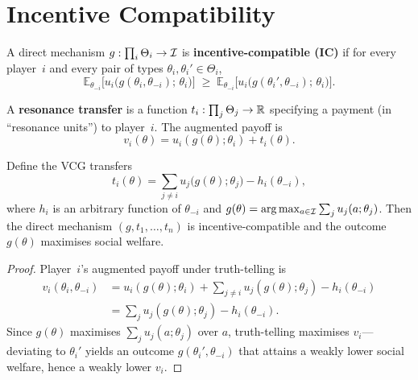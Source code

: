 \section{Incentive Compatibility}
\label{sec:ic}

\begin{definition}
\label{def:ic}
A direct mechanism $g : \prod_i \Theta_i \to \mathcal{I}$ is
\textbf{incentive-compatible (IC)} if for every player~$i$
and every pair of types $\theta_i, \theta_i' \in \Theta_i$,
\[
  \mathbb{E}_{\theta_{-i}}\bigl[
    u_i\bigl(g(\theta_i,\theta_{-i});\, \theta_i\bigr)
  \bigr]
  \;\ge\;
  \mathbb{E}_{\theta_{-i}}\bigl[
    u_i\bigl(g(\theta_i',\theta_{-i});\, \theta_i\bigr)
  \bigr].
\]
\end{definition}

\begin{definition}
\label{def:transfer}
A \textbf{resonance transfer} is a function
$t_i : \prod_j \Theta_j \to \mathbb{R}$ specifying a payment
(in ``resonance units'') to player~$i$.  The augmented payoff is
\[
  v_i(\theta) = u_i(g(\theta);\theta_i) + t_i(\theta).
\]
\end{definition}

\begin{theorem}
\label{thm:vcg}
Define the VCG transfers
\[
  t_i(\theta)
  = \sum_{j \neq i}
    u_j\bigl(g(\theta);\theta_j\bigr)
  - h_i(\theta_{-i}),
\]
where $h_i$ is an arbitrary function of $\theta_{-i}$ and
$g(\theta) = \arg\max_{a \in \mathcal{I}} \sum_{j} u_j(a;\theta_j)$.
Then the direct mechanism $(g, t_1,\ldots,t_n)$ is
incentive-compatible and the outcome $g(\theta)$ maximises
social welfare.
\end{theorem}

\begin{proof}
Player~$i$'s augmented payoff under truth-telling is
\begin{align*}
  v_i(\theta_i,\theta_{-i})
  &= u_i(g(\theta);\theta_i) + \sum_{j\neq i} u_j(g(\theta);\theta_j) - h_i(\theta_{-i}) \\
  &= \sum_j u_j(g(\theta);\theta_j) - h_i(\theta_{-i}).
\end{align*}
Since $g(\theta)$ maximises $\sum_j u_j(a;\theta_j)$ over $a$,
truth-telling maximises $v_i$---deviating to $\theta_i'$ yields
an outcome $g(\theta_i',\theta_{-i})$ that attains a weakly
lower social welfare, hence a weakly lower $v_i$.
\end{proof}

